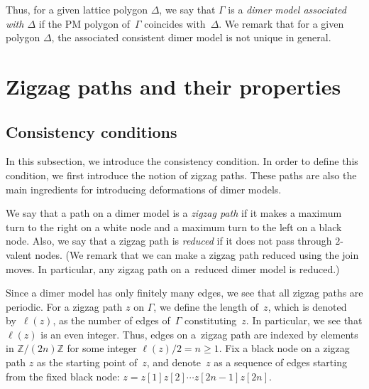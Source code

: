 \documentclass[11pt]{article}
\numberwithin{equation}{section}
\numberwithin{equation}{section}
\numberwithin{figure}{section}
\numberwithin{table}{section}
\newcommand{\ZZ}{\mathbb{Z}}
\begin{document}
Thus, for a given lattice polygon $\Delta$, we say that $\Gamma$ is a \emph{dimer model associated with $\Delta$} if the PM polygon of~$\Gamma$ coincides with~$\Delta$.
We remark that for a given polygon $\Delta$, the associated consistent dimer model is not unique in general.

\section{Zigzag paths and their properties}\label{sec_zigzag}

\subsection{Consistency conditions}\label{subsec_consistency}

In this subsection, we introduce the consistency condition.
In order to define this condition, we first introduce the notion of zigzag paths.
These paths are also the main ingredients for introducing deformations of dimer models.

\begin{Definition}We say that a path on a dimer model is a \emph{zigzag path} if it makes a maximum turn to the right on a white node and a maximum turn to the left on a black node.
Also, we say that a zigzag path is \emph{reduced} if it does not pass through $2$-valent nodes.
(We remark that we can make a zigzag path reduced using the join moves. In particular, any zigzag path on a~reduced dimer model is reduced.)
\end{Definition}

Since a dimer model has only finitely many edges, we see that all zigzag paths are periodic.
For a zigzag path $z$ on $\Gamma$, we define the length of~$z$, which is denoted by~$\ell(z)$, as the number of edges of~$\Gamma$ constituting~$z$.
In particular, we see that $\ell(z)$ is an even integer.
Thus, edges on a~zigzag path are indexed by elements in $\ZZ/(2n)\ZZ$ for some integer $\ell(z)/2=n\ge 1$.
Fix a black node on a zigzag path $z$ as the starting point of~$z$, and denote~$z$ as a sequence of edges starting from the fixed black node:
$z=z[1]z[2]\cdots z[2n-1]z[2n]$.
\end{document}
